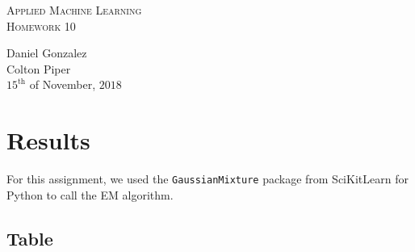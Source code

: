 \documentclass[UTF8]{article}
\begin{document}
\begin{center}
	\textsc{\huge Applied Machine Learning}\\
	\textsc{\Large Homework 10}\\
\end{center}
\begin{flushright}
	Daniel Gonzalez\\
    Colton Piper\\
	$15^{\text{th}}$ of November, $2018$
\end{flushright}


\section{Results}
For this assignment, we used the \texttt{GaussianMixture} package from SciKitLearn for Python to call the EM algorithm.

\subsection{Table}
\end{document}
